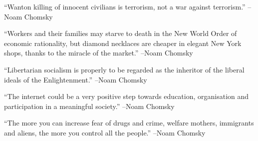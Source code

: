 \documentclass{article}%
\begin{document}
\linebreak%
\vspace{1mm}%
\begin{minipage}{\textwidth}%
\flushleft%
“Wanton killing of innocent civilians is terrorism, not a war against terrorism.”%
\linebreak%
\vspace{1mm}%
–Noam Chomsky%
\linebreak%
\vspace{1mm}%
\end{minipage}%
\linebreak%
\vspace{1mm}%
\begin{minipage}{\textwidth}%
\flushleft%
“Workers and their families may starve to death in the New World Order of economic rationality, but diamond necklaces are cheaper in elegant New York shops, thanks to the miracle of the market.”%
\linebreak%
\vspace{1mm}%
–Noam Chomsky%
\linebreak%
\vspace{1mm}%
\end{minipage}%
\linebreak%
\vspace{1mm}%
\begin{minipage}{\textwidth}%
\flushleft%
“Libertarian socialism is properly to be regarded as the inheritor of the liberal ideals of the Enlightenment.”%
\linebreak%
\vspace{1mm}%
–Noam Chomsky%
\linebreak%
\vspace{1mm}%
\end{minipage}%
\linebreak%
\vspace{1mm}%
\begin{minipage}{\textwidth}%
\flushleft%
“The internet could be a very positive step towards education, organisation and participation in a meaningful society.”%
\linebreak%
\vspace{1mm}%
–Noam Chomsky%
\linebreak%
\vspace{1mm}%
\end{minipage}%
\linebreak%
\vspace{1mm}%
\begin{minipage}{\textwidth}%
\flushleft%
“The more you can increase fear of drugs and crime, welfare mothers, immigrants and aliens, the more you control all the people.”%
\linebreak%
\vspace{1mm}%
–Noam Chomsky%
\linebreak%
\vspace{1mm}%
\end{minipage}%
\end{document}
